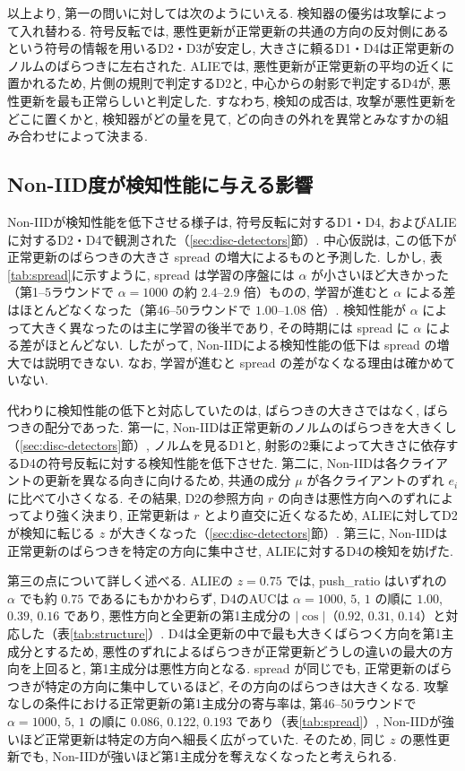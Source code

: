 \documentclass[a4j, twocolumn, dvipdfmx]{jsarticle}
\newcommand{\PushRatio}{\textrm{push\_ratio}}
\newcommand{\Spread}{\textrm{spread}}
\begin{document}
以上より, 第一の問いに対しては次のようにいえる. 検知器の優劣は攻撃によって入れ替わる. 符号反転では, 悪性更新が正常更新の共通の方向の反対側にあるという符号の情報を用いるD2・D3が安定し, 大きさに頼るD1・D4は正常更新のノルムのばらつきに左右された. ALIEでは, 悪性更新が正常更新の平均の近くに置かれるため, 片側の規則で判定するD2と, 中心からの射影で判定するD4が, 悪性更新を最も正常らしいと判定した. すなわち, 検知の成否は, 攻撃が悪性更新をどこに置くかと, 検知器がどの量を見て, どの向きの外れを異常とみなすかの組み合わせによって決まる.

\subsection{Non-IID度が検知性能に与える影響}
\label{sec:disc-noniid}

Non-IIDが検知性能を低下させる様子は, 符号反転に対するD1・D4, およびALIEに対するD2・D4で観測された（\ref{sec:disc-detectors}節）. 中心仮説は, この低下が正常更新のばらつきの大きさ \Spread{} の増大によるものと予測した. しかし, 表\ref{tab:spread}に示すように, \Spread{} は学習の序盤には $\alpha$ が小さいほど大きかった（第1--5ラウンドで $\alpha=1000$ の約 $2.4$--$2.9$ 倍）ものの, 学習が進むと $\alpha$ による差はほとんどなくなった（第46--50ラウンドで $1.00$--$1.08$ 倍）. 検知性能が $\alpha$ によって大きく異なったのは主に学習の後半であり, その時期には \Spread{} に $\alpha$ による差がほとんどない. したがって, Non-IIDによる検知性能の低下は \Spread{} の増大では説明できない. なお, 学習が進むと \Spread{} の差がなくなる理由は確かめていない.

代わりに検知性能の低下と対応していたのは, ばらつきの大きさではなく, ばらつきの配分であった. 第一に, Non-IIDは正常更新のノルムのばらつきを大きくし（\ref{sec:disc-detectors}節）, ノルムを見るD1と, 射影の2乗によって大きさに依存するD4の符号反転に対する検知性能を低下させた. 第二に, Non-IIDは各クライアントの更新を異なる向きに向けるため, 共通の成分 $\mu$ が各クライアントのずれ $e_i$ に比べて小さくなる. その結果, D2の参照方向 $r$ の向きは悪性方向へのずれによってより強く決まり, 正常更新は $r$ とより直交に近くなるため, ALIEに対してD2が検知に転じる $z$ が大きくなった（\ref{sec:disc-detectors}節）. 第三に, Non-IIDは正常更新のばらつきを特定の方向に集中させ, ALIEに対するD4の検知を妨げた.

第三の点について詳しく述べる. ALIEの $z=0.75$ では, \PushRatio{} はいずれの $\alpha$ でも約 $0.75$ であるにもかかわらず, D4のAUCは $\alpha=1000,\,5,\,1$ の順に $1.00$, $0.39$, $0.16$ であり, 悪性方向と全更新の第1主成分の $|\cos|$（$0.92$, $0.31$, $0.14$）と対応した（表\ref{tab:structure}）. D4は全更新の中で最も大きくばらつく方向を第1主成分とするため, 悪性のずれによるばらつきが正常更新どうしの違いの最大の方向を上回ると, 第1主成分は悪性方向となる. \Spread{} が同じでも, 正常更新のばらつきが特定の方向に集中しているほど, その方向のばらつきは大きくなる. 攻撃なしの条件における正常更新の第1主成分の寄与率は, 第46--50ラウンドで $\alpha=1000,\,5,\,1$ の順に $0.086$, $0.122$, $0.193$ であり（表\ref{tab:spread}）, Non-IIDが強いほど正常更新は特定の方向へ細長く広がっていた. そのため, 同じ $z$ の悪性更新でも, Non-IIDが強いほど第1主成分を奪えなくなったと考えられる.
\end{document}
